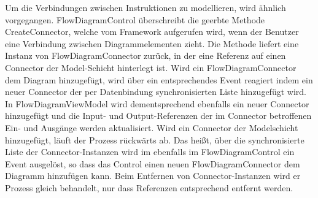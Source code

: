 \newline
Um die Verbindungen zwischen Instruktionen zu modellieren, wird ähnlich vorgegangen. FlowDiagramControl überschreibt die geerbte Methode CreateConnector, welche vom Framework aufgerufen wird, wenn der Benutzer eine Verbindung zwischen Diagrammelementen zieht. Die Methode liefert eine Instanz von FlowDiagramConnector zurück, in der eine Referenz auf einen Connector der Model-Schicht hinterlegt ist. Wird ein FlowDiagramConnector dem Diagram hinzugefügt, wird über ein entsprechendes Event reagiert indem ein neuer Connector der per Datenbindung synchronisierten Liste hinzugefügt wird. In FlowDiagramViewModel wird dementsprechend ebenfalls ein neuer Connector hinzugefügt und die Input- und Output-Referenzen der im Connector betroffenen Ein- und Ausgänge werden aktualisiert. Wird ein Connector der Modelschicht hinzugefügt, läuft der Prozess rückwärts ab. Das heißt, über die synchronisierte Liste der Connector-Instanzen wird im ebenfalls im FlowDiagramControl ein Event ausgelöst, so dass das Control einen neuen FlowDiagramConnector dem Diagramm hinzufügen kann. Beim Entfernen von Connector-Instanzen wird er Prozess gleich behandelt, nur dass Referenzen entsprechend entfernt werden.      


